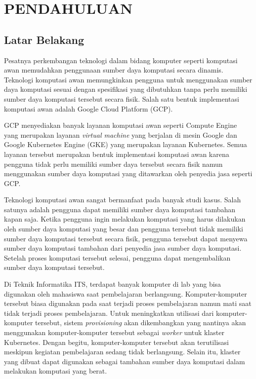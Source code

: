 \chapter{PENDAHULUAN}
\label{chap:pendahuluan}

\section{Latar Belakang}
\label{sec:latarbelakang}

Pesatnya perkembangan teknologi dalam bidang komputer
seperti komputasi awan memudahkan penggunaan sumber daya
komputasi secara dinamis. Teknologi komputasi awan memungkinkan
pengguna untuk menggunakan sumber daya komputasi sesuai dengan spesifikasi
yang dibutuhkan tanpa perlu memiliki sumber daya komputasi tersebut secara
fisik. Salah satu bentuk implementasi komputasi awan adalah
Google Cloud Platform (GCP).

GCP menyediakan banyak layanan komputasi awan seperti Compute Engine yang merupakan
layanan \emph{virtual machine} yang berjalan di mesin Google dan Google Kubernetes Engine (GKE)
yang merupakan layanan Kubernetes. Semua layanan tersebut merupakan bentuk implementasi
komputasi awan karena pengguna tidak perlu memiliki sumber daya tersebut secara
fisik namun menggunakan sumber daya komputasi yang ditawarkan oleh penyedia jasa seperti GCP.

Teknologi komputasi awan sangat bermanfaat pada banyak studi kasus. Salah satunya adalah pengguna
dapat memiliki sumber daya komputasi tambahan kapan saja. Ketika pengguna ingin melakukan komputasi
yang harus dilakukan oleh sumber daya komputasi yang besar dan pengguna tersebut tidak memiliki
sumber daya komputasi tersebut secara fisik, pengguna tersebut dapat menyewa sumber daya komputasi
tambahan dari penyedia jasa sumber daya komputasi. Setelah proses komputasi tersebut selesai, pengguna
dapat mengembalikan sumber daya komputasi tersebut.

Di Teknik Informatika ITS, terdapat banyak komputer di lab yang bisa digunakan oleh mahasiswa saat
pembelajaran berlangsung. Komputer-komputer tersebut biasa digunakan pada saat terjadi proses pembelajaran
namun mati saat tidak terjadi proses pembelajaran. Untuk meningkatkan utilisasi dari komputer-komputer tersebut,
sistem \emph{provisioning} akan dikembangkan yang nantinya akan menggunakan komputer-komputer tersebut sebagai
\emph{worker} untuk klaster Kubernetes. Dengan begitu, komputer-komputer tersebut akan terutilisasi
meskipun kegiatan pembelajaran sedang tidak berlangsung. Selain itu, klaster yang dibuat
dapat digunakan sebagai tambahan sumber daya komputasi dalam melakukan komputasi yang berat.

